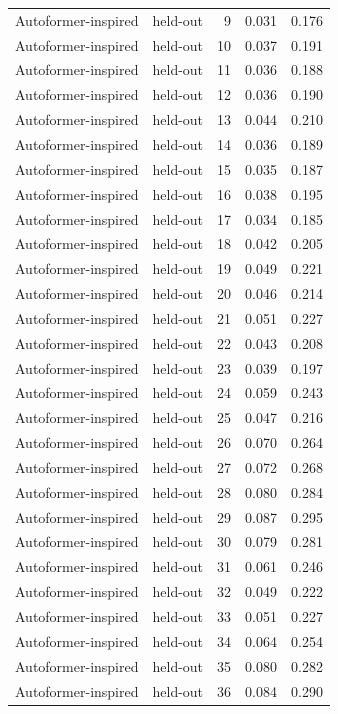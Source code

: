 \begin{tabular}{llrrr}
Autoformer-inspired & held-out & 9 & 0.031 & 0.176 \\
Autoformer-inspired & held-out & 10 & 0.037 & 0.191 \\
Autoformer-inspired & held-out & 11 & 0.036 & 0.188 \\
Autoformer-inspired & held-out & 12 & 0.036 & 0.190 \\
Autoformer-inspired & held-out & 13 & 0.044 & 0.210 \\
Autoformer-inspired & held-out & 14 & 0.036 & 0.189 \\
Autoformer-inspired & held-out & 15 & 0.035 & 0.187 \\
Autoformer-inspired & held-out & 16 & 0.038 & 0.195 \\
Autoformer-inspired & held-out & 17 & 0.034 & 0.185 \\
Autoformer-inspired & held-out & 18 & 0.042 & 0.205 \\
Autoformer-inspired & held-out & 19 & 0.049 & 0.221 \\
Autoformer-inspired & held-out & 20 & 0.046 & 0.214 \\
Autoformer-inspired & held-out & 21 & 0.051 & 0.227 \\
Autoformer-inspired & held-out & 22 & 0.043 & 0.208 \\
Autoformer-inspired & held-out & 23 & 0.039 & 0.197 \\
Autoformer-inspired & held-out & 24 & 0.059 & 0.243 \\
Autoformer-inspired & held-out & 25 & 0.047 & 0.216 \\
Autoformer-inspired & held-out & 26 & 0.070 & 0.264 \\
Autoformer-inspired & held-out & 27 & 0.072 & 0.268 \\
Autoformer-inspired & held-out & 28 & 0.080 & 0.284 \\
Autoformer-inspired & held-out & 29 & 0.087 & 0.295 \\
Autoformer-inspired & held-out & 30 & 0.079 & 0.281 \\
Autoformer-inspired & held-out & 31 & 0.061 & 0.246 \\
Autoformer-inspired & held-out & 32 & 0.049 & 0.222 \\
Autoformer-inspired & held-out & 33 & 0.051 & 0.227 \\
Autoformer-inspired & held-out & 34 & 0.064 & 0.254 \\
Autoformer-inspired & held-out & 35 & 0.080 & 0.282 \\
Autoformer-inspired & held-out & 36 & 0.084 & 0.290 \\

\end{tabular}
